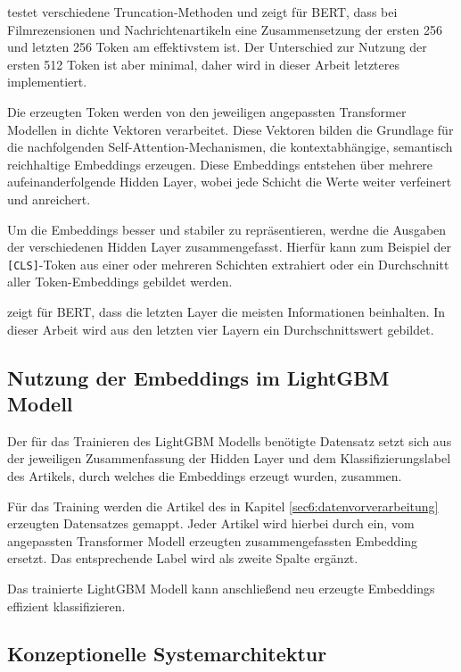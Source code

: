 \cite{sun2020finetuneberttextclassification} testet verschiedene Truncation-Methoden und zeigt für BERT, dass bei Filmrezensionen und Nachrichtenartikeln eine 
Zusammensetzung der ersten 256 und letzten 256 Token am effektivstem ist. Der Unterschied zur Nutzung der ersten 512 Token ist aber minimal, daher wird in dieser Arbeit letzteres
implementiert.

Die erzeugten Token werden von den jeweiligen angepassten Transformer Modellen in dichte Vektoren verarbeitet.
Diese Vektoren bilden die Grundlage für die nachfolgenden Self-Attention-Mechanismen, die kontextabhängige, semantisch reichhaltige Embeddings erzeugen.
Diese Embeddings entstehen über mehrere aufeinanderfolgende Hidden Layer, wobei jede Schicht die Werte weiter verfeinert und anreichert.

Um die Embeddings besser und stabiler zu repräsentieren, werdne die Ausgaben der verschiedenen Hidden Layer zusammengefasst. Hierfür kann zum Beispiel der \texttt{[CLS]}-Token 
aus einer oder mehreren Schichten extrahiert oder ein Durchschnitt aller Token-Embeddings gebildet werden.

\cite{sun2020finetuneberttextclassification} zeigt für BERT, dass die letzten Layer die meisten Informationen beinhalten.
In dieser Arbeit wird aus den letzten vier Layern ein Durchschnittswert gebildet.

\subsection{Nutzung der Embeddings im LightGBM Modell}

Der für das Trainieren des LightGBM Modells benötigte Datensatz setzt sich aus der jeweiligen Zusammenfassung der Hidden Layer und dem Klassifizierungslabel 
des Artikels, durch welches die Embeddings erzeugt wurden, zusammen. 

Für das Training werden die Artikel des in Kapitel \ref{sec6:datenvorverarbeitung} erzeugten Datensatzes gemappt. 
Jeder Artikel wird hierbei durch ein, vom angepassten Transformer Modell erzeugten zusammengefassten Embedding ersetzt.
Das entsprechende Label wird als zweite Spalte ergänzt.

Das trainierte LightGBM Modell kann anschließend neu erzeugte Embeddings effizient klassifizieren.

\subsection{Konzeptionelle Systemarchitektur}

